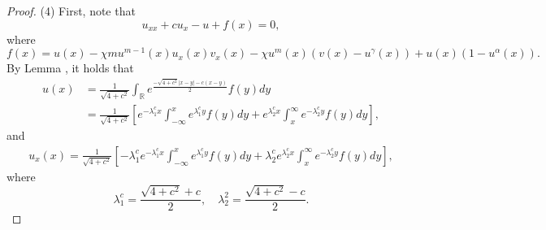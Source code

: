 \documentclass[11pt]{article} %
\theoremstyle{remark}
\theoremstyle{remark}
\numberwithin{equation}{section}
\numberwithin{figure}{section}
\numberwithin{table}{section}
\newcommand\RR{\ensuremath{\mathbb{R}}}
\begin{document}
\begin{proof}
\smallskip

(4) 
First, note that
$$
u_{xx}+cu_x-u+ f(x)=0,
$$
where
$$
f(x)= u(x)-\chi m u^{m-1}(x) u_x(x) v_x(x)-\chi u^m (x)(v(x)-u^\gamma(x))+u(x)(1-u^\alpha(x)).
$$
By Lemma \cite[Lemma 2.1]{SaSh2020-1}, it holds that
\begin{align}
\label{proof-estimate-eq2}
u(x)&=\frac{1}{\sqrt{4+c^2}}\int_{\RR} e^{\frac{-\sqrt{4+c^2} |x-y| -c(x-y)}{2}} f(y)dy\nonumber\\
&=\frac{1}{\sqrt{4+c^2}}\left[e^{-\lambda_1^c x}\int_{-\infty}^x e^{\lambda_1^c y} f(y)dy
+e^{\lambda_2^c x}\int_x^\infty e^{-\lambda_2 ^c y} f(y) dy\right],
\end{align}
and
\begin{align}
\label{proof-estimate-eq3}
u_x(x)=\frac{1}{\sqrt{4+c^2}}\left[-\lambda_1^c e^{-\lambda_1^c x}\int_{-\infty}^x e^{\lambda_1^c y} f(y)dy
+\lambda_2^c e^{\lambda_2^c x}\int_x^\infty e^{-\lambda_2 ^c y} f(y) dy\right],
\end{align}
where
$$
\lambda_1^c=\frac{\sqrt{4+c^2}+c}{2},\quad \lambda_2^2=\frac{\sqrt{4+c^2}-c}{2}.
$$



\end{proof}
\end{document}
